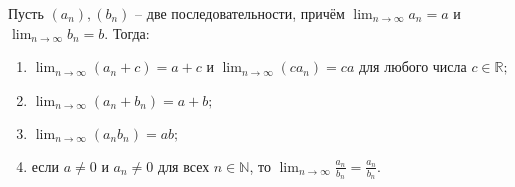 \begin{theorem}\label{a+b,ca,ab}
    Пусть $(a_n), (b_n )$ -- две последовательности, причём $\lim_{n\to \infty} a_n  =a$ и $\lim_{n\to \infty}b_n =b$. Тогда:
    \begin{enumerate}
        \item $\lim_{n\to \infty}(a_n + c) = a+c$ и $\lim_{n\to \infty}(ca_n) = ca$ для любого числа $c\in \mathbb{R};$
        \item $\lim_{n\to \infty}(a_n +b_n) = a+b;$
        \item $\lim_{n\to \infty}(a_nb_n) = ab;$
        \item если $a\ne 0$ и $a_n \ne 0$ для всех $n\in \mathbb{N}$, то $\lim_{n\to \infty}\frac{a_n}{b_n} = \frac{a_n}{b_n}.$
    \end{enumerate}
\end{theorem}
